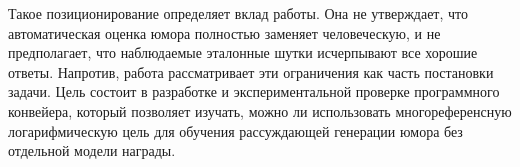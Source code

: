 Такое позиционирование определяет вклад работы. Она не утверждает, что автоматическая оценка юмора полностью заменяет человеческую, и не предполагает, что наблюдаемые эталонные шутки исчерпывают все хорошие ответы. Напротив, работа рассматривает эти ограничения как часть постановки задачи. Цель состоит в разработке и экспериментальной проверке программного конвейера, который позволяет изучать, можно ли использовать многореференсную логарифмическую цель для обучения рассуждающей генерации юмора без отдельной модели награды.